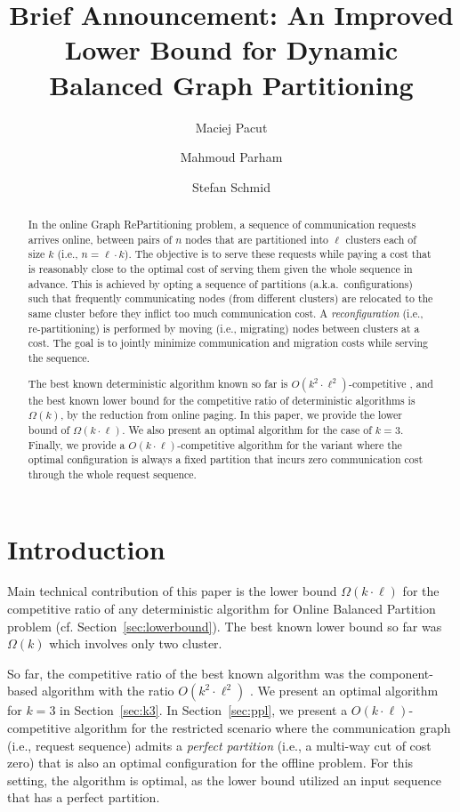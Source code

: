 \documentclass[manuscript,screen=true]{acmart}
\title{Brief Announcement: An Improved Lower Bound for Dynamic Balanced Graph Partitioning}
\author{Maciej Pacut}
\affiliation{%
  \institution{Faculty of Computer Science, University of Vienna}
  \country{Austria}
}
\author{Mahmoud Parham}
\affiliation{%
  \institution{Faculty of Computer Science, University of Vienna}
  \country{Austria}
}
\author{Stefan Schmid}
\affiliation{%
  \institution{Faculty of Computer Science, University of Vienna}
  \country{Austria}
}
\begin{document}
\begin{abstract}
  In the online Graph RePartitioning problem,
  a sequence of communication requests arrives online,
  between pairs of $n$ nodes that are partitioned into $\ell$ clusters
  each of size $k$ (i.e., $n = \ell \cdot k$).
  The objective is to serve these requests while paying a cost that is reasonably close to the optimal cost of serving them given  the whole sequence in advance. 
  This is achieved by opting a sequence of  partitions (a.k.a.~configurations)
  such that frequently communicating nodes (from different clusters)
  are relocated to the same cluster before they inflict too much communication cost.
  A \emph{reconfiguration} (i.e., re-partitioning) is performed by
  moving (i.e., migrating) nodes between clusters at a cost.
  The goal is to jointly minimize communication and migration costs while serving the sequence.

	The best known deterministic algorithm known so far is $O(k^2\cdot \ell^2)$-competitive \cite{repartition-disc},
	and the best known lower bound for the competitive ratio of
	deterministic algorithms is $\Omega(k)$,
 by the reduction from online paging.
	  In this paper, we provide the lower bound of $\Omega(k\cdot \ell)$.
    We also present an optimal algorithm for the case of $k=3$.
  Finally,
  we provide a $O(k\cdot \ell)$-competitive algorithm for the variant
  where the optimal configuration is always a fixed partition
  that incurs zero communication cost through the whole request sequence.
\end{abstract}
    
\maketitle
    
\renewcommand{\shortauthors}{M.~Pacut, M.~Parham, S.~Schmid}

\section{Introduction}

Main technical contribution of this paper is the lower bound $\Omega(k\cdot\ell)$ for the competitive ratio of any deterministic algorithm for Online Balanced Partition problem (cf. Section~\ref{sec:lowerbound}).
The best known lower bound so far was $\Omega(k)$ \cite{repartition-disc}
which involves only two cluster.


So far, the competitive ratio of the best known algorithm was the component-based algorithm with the ratio $O(k^2\cdot \ell^2)$ \cite{repartition-disc}.
We present an optimal algorithm for $k=3$ in Section~\ref{sec:k3}.
In Section~\ref{sec:ppl}, we present a $O(k\cdot \ell)$-competitive algorithm for the restricted scenario
where the communication graph (i.e., request sequence) admits a \emph{perfect partition} (i.e., a multi-way cut of cost zero) that is also an optimal configuration for the offline problem.
For this setting, the algorithm is optimal, as the lower bound utilized an input sequence that has a perfect partition.
\end{document}
